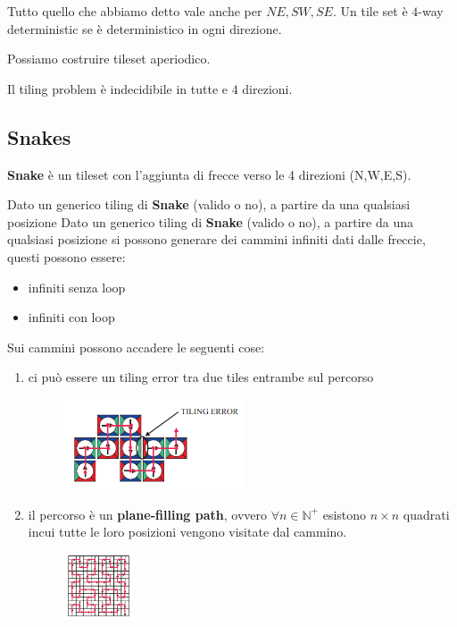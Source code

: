 Tutto quello che abbiamo detto vale anche per $NE, SW, SE$. Un tile set
è $4$-way deterministic se è deterministico in ogni direzione.

\begin{nota}
    Possiamo costruire tileset aperiodico.
\end{nota}

\begin{teorema}
    Il tiling problem è indecidibile in tutte e $4$ direzioni.
\end{teorema}

\subsection{Snakes}

\begin{definizione} 
    \textbf{Snake} è un tileset con l'aggiunta di frecce verso le 4 direzioni (N,W,E,S).
\end{definizione}

Dato un generico tiling di \textbf{Snake} (valido o no), a partire da una qualsiasi posizione
Dato un generico tiling di \textbf{Snake} (valido o no), a partire da una qualsiasi posizione
si possono generare dei cammini infiniti dati dalle freccie, questi possono
essere:
\begin{itemize}
    \item infiniti senza loop
    \item infiniti con loop
\end{itemize}

Sui cammini possono accadere le seguenti cose:
\begin{enumerate}
    \item ci può essere un tiling error tra due tiles entrambe sul percorso
          \begin{figure}[!h]
              \centering
              \includegraphics[width=0.5\textwidth]{img/sistemi_complessi/snake1.png}
          \end{figure}
    \item il percorso è un \textbf{plane-filling path}, ovvero $\forall n\in \mathbb{N}^+$
          esistono $n\times n$ quadrati incui tutte le loro posizioni vengono visitate
          dal cammino.
          \begin{figure}[!h]
              \centering
              \includegraphics[width=0.2\textwidth]{img/sistemi_complessi/snake2.png}
          \end{figure}
\end{enumerate}

